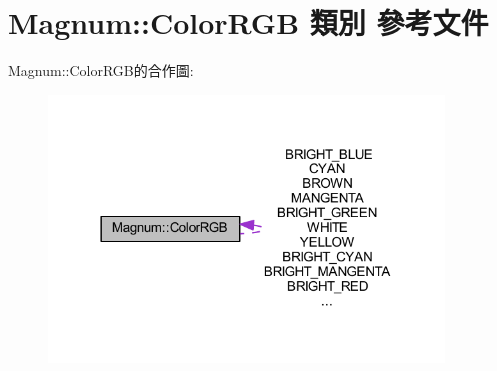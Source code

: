 \hypertarget{class_magnum_1_1_color_r_g_b}{}\section{Magnum\+:\+:Color\+R\+GB 類別 參考文件}
\label{class_magnum_1_1_color_r_g_b}


Magnum\+:\+:Color\+R\+G\+B的合作圖\+:\nopagebreak
\begin{figure}[H]
\begin{center}
\leavevmode
\includegraphics[width=298pt]{class_magnum_1_1_color_r_g_b__coll__graph}
\end{center}
\end{figure}
